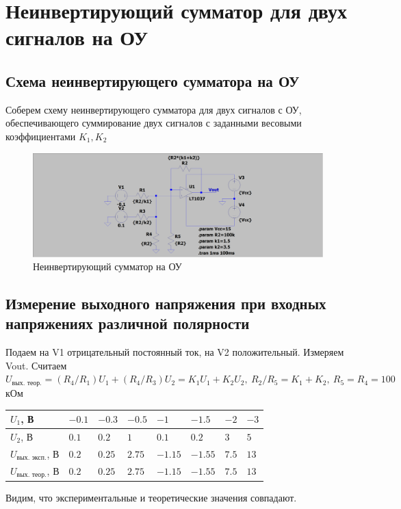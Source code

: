 \documentclass[a4paper, 12pt]{article}
\begin{document}
    \section{Неинвертирующий сумматор для двух сигналов на ОУ}
    \subsection{Схема неинвертирующего сумматора на ОУ}
    Соберем схему неинвертирующего сумматора для двух сигналов с ОУ,
    обеспечивающего суммирование двух сигналов с заданными весовыми
    коэффициентами $K_1,K_2$
    \begin{figure}[H]
        \centering
        \includegraphics[scale=0.22]{scheme5.png}
        \captionsetup{skip=0pt}
        \caption{Неинвертирующий сумматор на ОУ}
        \label{fig:scheme5}
    \end{figure}


    \subsection{Измерение выходного напряжения при входных напряжениях различной полярности}
    Подаем на V1 отрицательный постоянный ток, на V2 положительный. Измеряем Vout. Считаем
    $U_{\text{вых. теор.}}=\left(R_4/R_1\right)U_1+\left(R_4/R_3\right)U_2=K_1U_1+K_2U_2,\ R_2/R_5=K_1+K_2,\ R_5=R_4=100$ кОм
    \begin{center}
        \begin{tabular}{ | m{6em} | m{3em}| m{3em} | m{3em} | m{3em} | m{3em} | m{3em} | m{3em} | } 
        \hline
        $U_1$, В& $-0.1$ &$-0.3$ &$-0.5$ &$-1$& $-1.5$ & $-2$ & $-3$\\ 
        \hline
        $U_2$, В& $0.1$ &$0.2$ &$1$ &$0.1$& $0.2$ & $3$ &$5$\\ 
        \hline
        $U_{\text{вых. эксп.}}$, В& $0.2$ &$0.25$ &$2.75$ &$-1.15$& $-1.55$ & $7.5$ &$13$\\
        \hline
        $U_{\text{вых. теор.}}$, В& $0.2$ &$0.25$ &$2.75$ &$-1.15$& $-1.55$ & $7.5$& $13$\\
        \hline
        \end{tabular}
    \end{center}
    Видим, что экспериментальные и теоретические значения совпадают.
\end{document}
